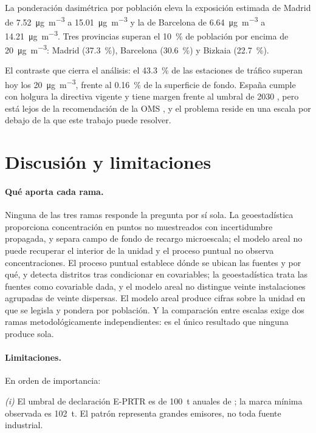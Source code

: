 \documentclass[10pt,twocolumn,a4paper]{article}
\newcommand{\ugm}{\si{\micro\gram\per\cubic\metre}}
\begin{document}
La ponderación dasimétrica por población eleva la exposición estimada de
Madrid de \SI{7.52}{\ugm} a \SI{15.01}{\ugm} y la de Barcelona de
\SI{6.64}{\ugm} a \SI{14.21}{\ugm}. Tres provincias superan el
\SI{10}{\percent} de población por encima de \SI{20}{\ugm}: Madrid
(\SI{37.3}{\percent}), Barcelona (\SI{30.6}{\percent}) y Bizkaia
(\SI{22.7}{\percent}).

El contraste que cierra el análisis: el \SI{43.3}{\percent} de las estaciones
de tráfico superan hoy los \SI{20}{\ugm}, frente al \SI{0.16}{\percent} de la
superficie de fondo. España cumple con holgura la directiva vigente y tiene
margen frente al umbral de 2030 \citep{directiva2024}, pero está lejos de la
recomendación de la OMS \citep{who2021}, y el problema reside en una escala
por debajo de la que este trabajo puede resolver.

\section{Discusión y limitaciones}

\paragraph{Qué aporta cada rama.} Ninguna de las tres ramas responde la
pregunta por sí sola. La geoestadística proporciona concentración en puntos no
muestreados con incertidumbre propagada, y separa campo de fondo de recargo
microescala; el modelo areal no puede recuperar el interior de la unidad y el
proceso puntual no observa concentraciones. El proceso puntual establece dónde
se ubican las fuentes y por qué, y detecta distritos tras condicionar en
covariables; la geoestadística trata las fuentes como covariable dada, y el
modelo areal no distingue veinte instalaciones agrupadas de veinte dispersas.
El modelo areal produce cifras sobre la unidad en que se legisla y pondera por
población. Y la comparación entre escalas exige dos ramas metodológicamente
independientes: es el único resultado que ninguna produce sola.

\paragraph{Limitaciones.} En orden de importancia:

\emph{(i)} El umbral de declaración E-PRTR es de \SI{100}{\tonne} anuales de ; la marca mínima observada es \SI{102}{\tonne}. El patrón representa
grandes emisores, no toda fuente industrial.
\end{document}
